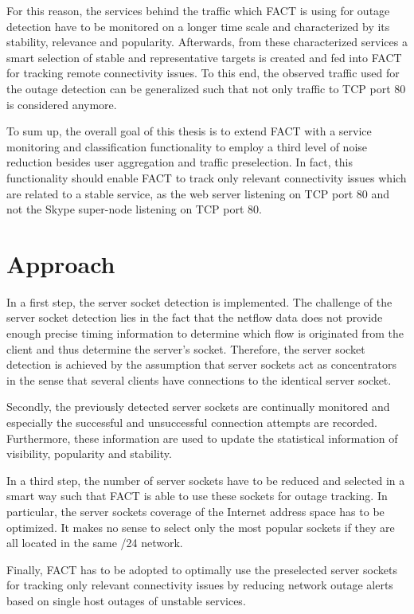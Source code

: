 \documentclass{sigcomm-alternate}
\begin{document}
For this reason, the services behind the traffic which FACT is using for outage detection have to be monitored on a longer time scale and characterized by its stability, relevance and popularity. Afterwards, from these characterized services a smart selection of stable and representative targets is created and fed into FACT for tracking remote connectivity issues. To this end, the observed traffic used for the outage detection can be generalized such that not only traffic to TCP port 80 is considered anymore. 

To sum up, the overall goal of this thesis is to extend FACT with a service monitoring and classification functionality to employ a third level of noise reduction besides user aggregation and traffic preselection. In fact, this functionality should enable FACT to track only relevant connectivity issues which are related to a stable service, as the web server listening on TCP port 80 and not the Skype super-node listening on TCP port 80.

\section{Approach}

In a first step, the server socket detection is implemented. The challenge of the server socket detection lies in the fact that the netflow data does not provide enough precise timing information to determine which flow is originated from the client and thus determine the server's socket. Therefore, the server socket detection is achieved by the assumption that server sockets act as concentrators in the sense that several clients have connections to the identical server socket.

Secondly, the previously detected server sockets are continually monitored and especially the successful and unsuccessful connection attempts are recorded. Furthermore, these information are used to update the statistical information of visibility, popularity and stability.

In a third step, the number of server sockets have to be reduced and selected in a smart way such that FACT is able to use these sockets for outage tracking. In particular, the server sockets coverage of the Internet address space has to be optimized. It makes no sense to select only the most popular sockets if they are all located in the same /24 network. 

Finally, FACT has to be adopted to optimally use the preselected server sockets for tracking only relevant connectivity issues by reducing network outage alerts based on single host outages of unstable services. 
\end{document}
